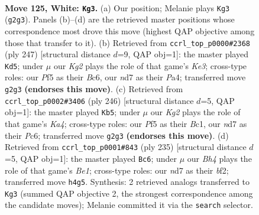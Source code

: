 \documentclass[11pt]{article}
\begin{document}
\clearpage

\begin{figure}[p]\centering
\begin{subfigure}{0.46\textwidth}\centering
\resizebox{\linewidth}{!}{%
\newchessgame
\chessboard[
  setfen={7k/3n4/8/5P1P/p6B/P7/6K1/8 w - - 5 125},
  showmover=false,
  pgfstyle=straightmove, color=movearrow, markmove={g2-g3}
]}
\caption{}
\end{subfigure}\hfill
\begin{subfigure}{0.46\textwidth}\centering
\resizebox{\linewidth}{!}{%
\newchessgame
\chessboard[
  setfen={8/8/2b1k3/7p/p6P/B7/8/1K6 b - - 7 124},
  showmover=false,
  pgfstyle=straightmove, color=movearrow, markmove={e6-d5}
]}
\caption{}
\end{subfigure}
\\[4pt]
\begin{subfigure}{0.46\textwidth}\centering
\resizebox{\linewidth}{!}{%
\newchessgame
\chessboard[
  setfen={3k4/8/2P3p1/8/K1P3bP/8/8/2B5 w - - 1 124},
  showmover=false,
  pgfstyle=straightmove, color=movearrow, markmove={a4-b5}
]}
\caption{}
\end{subfigure}\hfill
\begin{subfigure}{0.46\textwidth}\centering
\resizebox{\linewidth}{!}{%
\newchessgame
\chessboard[
  setfen={4b3/1p5k/8/8/5K2/1p6/1P3B2/8 b - - 5 118},
  showmover=false,
  pgfstyle=straightmove, color=movearrow, markmove={e8-c6}
]}
\caption{}
\end{subfigure}
\caption{\textbf{Move 125, White: \texttt{Kg3}.} (a) Our position; Melanie plays \texttt{Kg3} (\texttt{g2g3}). Panels (b)--(d) are the retrieved master positions whose correspondence most drove this move (highest QAP objective among those that transfer to it). (b) Retrieved from \texttt{ccrl\_top\_p0000\#2368} (ply 247) [structural distance $d$=9, QAP obj=1]: the master played \texttt{Kd5}; under $\mu$ our \emph{Kg2} plays the role of that game's \emph{Ke3}; cross-type roles: our \emph{P}f5 as their \emph{B}c6, our \emph{n}d7 as their \emph{P}a4; transferred move \texttt{g2g3} \textbf{(endorses this move)}. (c) Retrieved from \texttt{ccrl\_top\_p0002\#3406} (ply 246) [structural distance $d$=5, QAP obj=1]: the master played \texttt{Kb5}; under $\mu$ our \emph{Kg2} plays the role of that game's \emph{Ka4}; cross-type roles: our \emph{P}f5 as their \emph{B}c1, our \emph{n}d7 as their \emph{P}c6; transferred move \texttt{g2g3} \textbf{(endorses this move)}. (d) Retrieved from \texttt{ccrl\_top\_p0001\#843} (ply 235) [structural distance $d$=5, QAP obj=1]: the master played \texttt{Bc6}; under $\mu$ our \emph{Bh4} plays the role of that game's \emph{Be1}; cross-type roles: our \emph{n}d7 as their \emph{b}f2; transferred move \texttt{h4g5}. Synthesis: 2 retrieved analogs transferred to \texttt{Kg3} (summed QAP objective 2, the strongest correspondence among the candidate moves); Melanie committed it via the \texttt{search} selector.}
\label{fig:thought-m248}
\end{figure}
\end{document}
